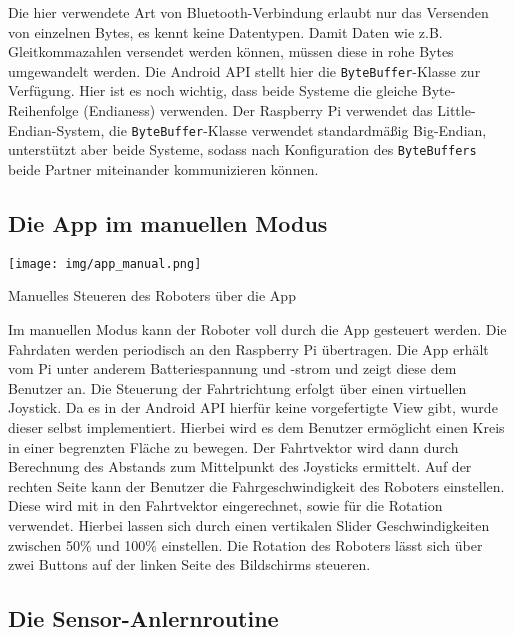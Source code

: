 \documentclass[12pt, a4paper]{report}
\begin{document}
Die hier verwendete Art von Bluetooth-Verbindung erlaubt nur das Versenden von einzelnen Bytes, es kennt keine Datentypen. Damit Daten wie z.B. Gleitkommazahlen versendet werden können, müssen diese in rohe Bytes umgewandelt werden. Die Android API stellt hier die \texttt{ByteBuffer}-Klasse zur Verfügung. Hier ist es noch wichtig, dass beide Systeme die gleiche Byte-Reihenfolge (Endianess) verwenden. Der Raspberry Pi verwendet das Little-Endian-System, die \texttt{ByteBuffer}-Klasse verwendet standardmäßig Big-Endian, unterstützt aber beide Systeme, sodass nach Konfiguration des \texttt{ByteBuffers} beide Partner miteinander kommunizieren können.


\newpage
\subsection{Die App im manuellen Modus}

\begin{minipage}{\linewidth}
   \centering
   \captionsetup{type=figure, justification=centering}
   \texttt{[image: img/app\_manual.png]}
   \caption{Manuelles Steueren des Roboters über die App}
\end{minipage}
\vspace*{0.25cm}

Im manuellen Modus kann der Roboter voll durch die App gesteuert werden. Die Fahrdaten werden periodisch an den Raspberry Pi übertragen. Die App erhält vom Pi unter anderem Batteriespannung und -strom und zeigt diese dem Benutzer an. Die Steuerung der Fahrtrichtung erfolgt über einen virtuellen Joystick. Da es in der Android API hierfür keine vorgefertigte View gibt, wurde dieser selbst implementiert. Hierbei wird es dem Benutzer ermöglicht einen Kreis in einer begrenzten Fläche zu bewegen. Der Fahrtvektor wird dann durch Berechnung des Abstands zum Mittelpunkt des Joysticks ermittelt. Auf der rechten Seite kann der Benutzer die Fahrgeschwindigkeit des Roboters einstellen. Diese wird mit in den Fahrtvektor eingerechnet, sowie für die Rotation verwendet. Hierbei lassen sich durch einen vertikalen Slider Geschwindigkeiten zwischen 50\% und 100\% einstellen. Die Rotation des Roboters lässt sich über zwei Buttons auf der linken Seite des Bildschirms steueren.


\subsection{Die Sensor-Anlernroutine}
\end{document}
